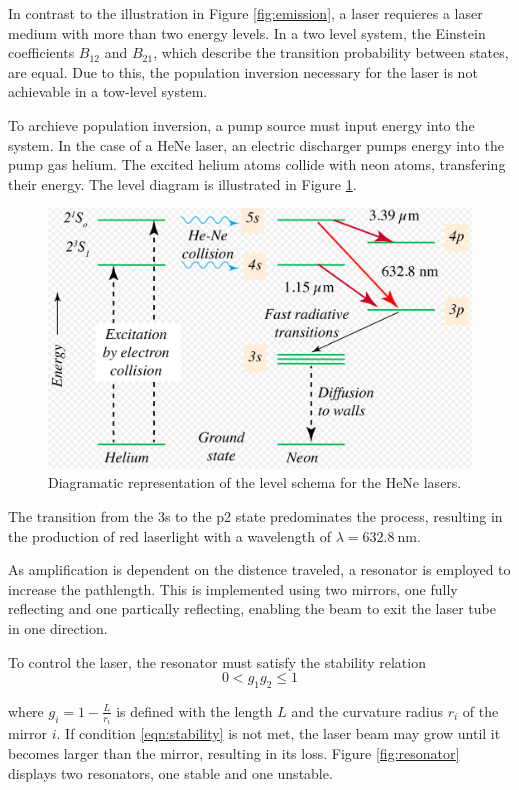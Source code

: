 In contrast to the illustration in Figure \ref{fig:emission}, a laser 
requieres a laser medium with more than two energy levels. In a two 
level system, the Einstein coefficients $B_{12}$ and $B_{21}$, which 
describe the transition probability between states, are equal. Due to 
this, the population inversion necessary for the laser is not achievable
in a tow-level system.

To archieve population inversion, a pump source must input energy 
into the system. In the case of a HeNe laser, an electric discharger 
pumps energy into the pump gas helium. The excited helium atoms 
collide with neon atoms, transfering their energy. The level diagram is 
illustrated in Figure \ref{fig:level}.

\begin{figure}
    \centering
    \includegraphics[width=0.7\linewidth]{pictures/level.png} %
    \caption{Diagramatic representation of the level schema for the HeNe lasers. \cite{Wikipedia}}
    \label{fig:level}
\end{figure}
The transition from the 3s to the p2 state predominates the process, 
resulting in the production of red laserlight with a wavelength of 
$\lambda = \SI{632.8}{\nano\meter}$.

As amplification is dependent on the distence traveled, a resonator is 
employed to increase the pathlength. This is implemented using two 
mirrors, one fully reflecting and one partically reflecting, enabling
the beam to exit the laser tube in one direction.

To control the laser, the resonator must satisfy the stability relation
\begin{equation}
    0 < g_1g_2 \leq 1
    \label{eqn:stability}
\end{equation}

where $g_i=1-\frac{L}{r_i}$ is defined with the length $L$ and the 
curvature radius $r_i$ of the mirror $i$. If condition \eqref{eqn:stability}
is not met, the laser beam may grow until it becomes larger than the mirror,
resulting in its loss. Figure \ref{fig:resonator} displays two resonators,
one stable and one unstable.

